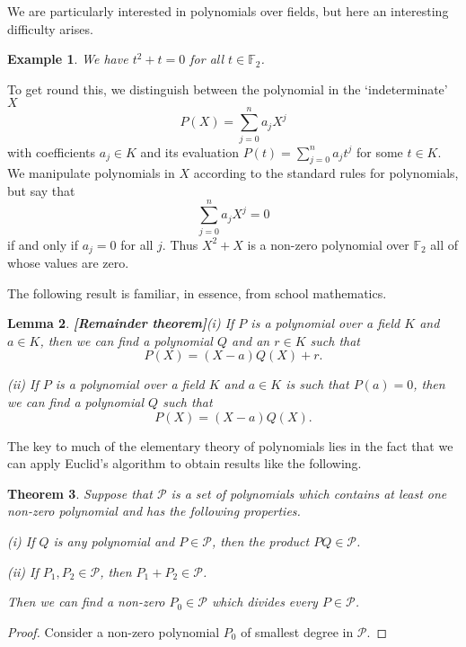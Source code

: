 \documentclass[12pt,a4paper]{article}
\theoremstyle{plain}
\newtheorem{theorem}{Theorem}[section]
\newtheorem{lemma}[theorem]{Lemma}
\newtheorem{example}[theorem]{Example}
\theoremstyle{definition}
\begin{document}
We are particularly interested in polynomials over
fields, but here an interesting difficulty arises.
\begin{example}
We have $t^{2}+t=0$ for all $t\in{\mathbb F}_{2}$.
\end{example}
To get round this, we distinguish between the
polynomial in the `indeterminate' $X$
\[P(X)=\sum_{j=0}^{n}a_{j}X^{j}\]
with coefficients $a_{j}\in K$ and its
evaluation $P(t)=\sum_{j=0}^{n}a_{j}t^{j}$
for some $t\in K$. We manipulate polynomials in $X$
according to the standard rules for polynomials,
but say that
\[\sum_{j=0}^{n}a_{j}X^{j}=0\]
if and only if $a_{j}=0$ for all $j$.
Thus $X^{2}+X$ is a non-zero polynomial
over ${\mathbb F}_{2}$ all of whose values are zero.

The following result is familiar, in essence,
from school mathematics.
\begin{lemma}{\bf [Remainder theorem]}\label{remainder}
(i) If $P$ is a polynomial over a field $K$
and $a\in K$, then we can find a polynomial $Q$ and an
$r\in K$ such that
\[P(X)=(X-a)Q(X)+r.\]

(ii) If $P$ is a polynomial over a field $K$
and $a\in K$ is such that $P(a)=0$, then
we can find a polynomial $Q$ such that
\[P(X)=(X-a)Q(X).\]
\end{lemma}

The key to much of the elementary theory of
polynomials lies in the fact that we can apply
Euclid's algorithm to obtain results like the
following.
\begin{theorem}\label{greatest common}
Suppose that $\mathcal{P}$ is a
set of polynomials which contains at least one
non-zero polynomial and has the following properties.

(i) If $Q$ is any polynomial and $P\in\mathcal{P}$,
then the product $PQ\in\mathcal{P}$.

(ii) If $P_{1},P_{2}\in \mathcal{P}$,
then $P_{1}+P_{2}\in \mathcal{P}$.

Then we can find a non-zero $P_{0}\in\mathcal{P}$ which
divides every $P\in\mathcal{P}$.
\end{theorem}
\begin{proof} Consider a non-zero polynomial $P_{0}$
of smallest degree in ${\mathcal P}$.
\end{proof}
\end{document}

